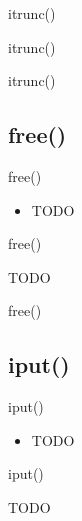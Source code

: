 \documentclass{beamer}
\begin{document}
\begin{frame}{itrunc()}
\end{frame}

\begin{frame}{itrunc()}
\end{frame}

\begin{frame}{itrunc()}
\end{frame}




\subsection{free()}

\begin{frame}{free()}
    \begin{itemize}
        \item TODO
    \end{itemize}
\end{frame}

\begin{frame}{free()}
    \begin{algorithmic}[1]
        \State TODO
    \end{algorithmic}
\end{frame}

\begin{frame}{free()}
\end{frame}




\subsection{iput()}

\begin{frame}{iput()}
    \begin{itemize}
        \item TODO
    \end{itemize}
\end{frame}

\begin{frame}{iput()}
    \begin{algorithmic}[1]
        \State TODO
    \end{algorithmic}
\end{frame}
\end{document}
